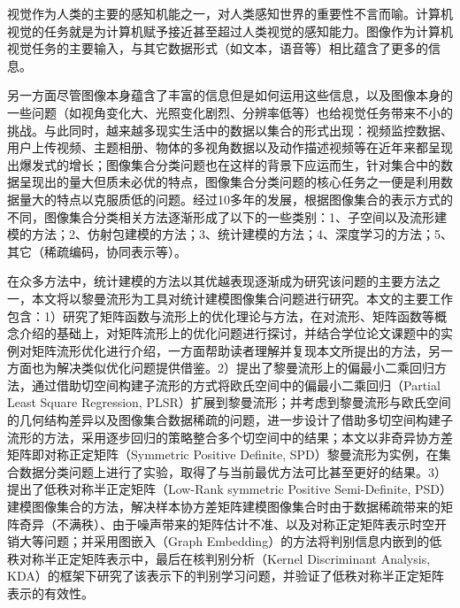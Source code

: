 \begin{cabstract}
视觉作为人类的主要的感知机能之一，对人类感知世界的重要性不言而喻。计算机视觉的任务就是为计算机赋予接近甚至超过人类视觉的感知能力。图像作为计算机视觉任务的主要输入，与其它数据形式（如文本，语音等）相比蕴含了更多的信息。

另一方面尽管图像本身蕴含了丰富的信息但是如何运用这些信息，以及图像本身的一些问题（如视角变化大、光照变化剧烈、分辨率低等）也给视觉任务带来不小的挑战。与此同时，越来越多现实生活中的数据以集合的形式出现：视频监控数据、用户上传视频、主题相册、物体的多视角数据以及动作描述视频等在近年来都呈现出爆发式的增长；图像集合分类问题也在这样的背景下应运而生，针对集合中的数据呈现出的量大但质未必优的特点，图像集合分类问题的核心任务之一便是利用数据量大的特点以克服质低的问题。经过10多年的发展，根据图像集合的表示方式的不同，图像集合分类相关方法逐渐形成了以下的一些类别：1、子空间以及流形建模的方法；2、仿射包建模的方法；3、统计建模的方法；4、深度学习的方法；5、其它（稀疏编码，协同表示等）。

在众多方法中，统计建模的方法以其优越表现逐渐成为研究该问题的主要方法之一，本文将以黎曼流形为工具对统计建模图像集合问题进行研究。本文的主要工作包含：1）研究了矩阵函数与流形上的优化理论与方法，在对流形、矩阵函数等概念介绍的基础上，对矩阵流形上的优化问题进行探讨，并结合学位论文课题中的实例对矩阵流形优化进行介绍，一方面帮助读者理解并复现本文所提出的方法，另一方面也为解决类似优化问题提供借鉴。2）提出了黎曼流形上的偏最小二乘回归方法，通过借助切空间构建子流形的方式将欧氏空间中的偏最小二乘回归（Partial Least Square Regression, PLSR）扩展到黎曼流形；并考虑到黎曼流形与欧氏空间的几何结构差异以及图像集合数据稀疏的问题，进一步设计了借助多切空间构建子流形的方法，采用逐步回归的策略整合多个切空间中的结果；本文以非奇异协方差矩阵即对称正定矩阵（Symmetric Positive Definite, SPD）黎曼流形为实例，在集合数据分类问题上进行了实验，取得了与当前最优方法可比甚至更好的结果。3）提出了低秩对称半正定矩阵（Low-Rank symmetric Positive Semi-Definite, PSD）建模图像集合的方法，解决样本协方差矩阵建模图像集合时由于数据稀疏带来的矩阵奇异（不满秩）、由于噪声带来的矩阵估计不准、以及对称正定矩阵表示时空开销大等问题；并采用图嵌入（Graph Embedding）的方法将判别信息内嵌到的低秩对称半正定矩阵表示中，最后在核判别分析（Kernel Discriminant Analysis, KDA）的框架下研究了该表示下的判别学习问题，并验证了低秩对称半正定矩阵表示的有效性。


\end{cabstract}
